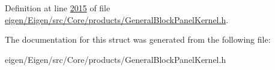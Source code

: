 Definition at line \hyperlink{eigen_2_eigen_2src_2_core_2products_2_general_block_panel_kernel_8h_source_l02015}{2015} of file \hyperlink{eigen_2_eigen_2src_2_core_2products_2_general_block_panel_kernel_8h_source}{eigen/\+Eigen/src/\+Core/products/\+General\+Block\+Panel\+Kernel.\+h}.



The documentation for this struct was generated from the following file\+:\begin{DoxyCompactItemize}
\item 
eigen/\+Eigen/src/\+Core/products/\+General\+Block\+Panel\+Kernel.\+h\end{DoxyCompactItemize}
